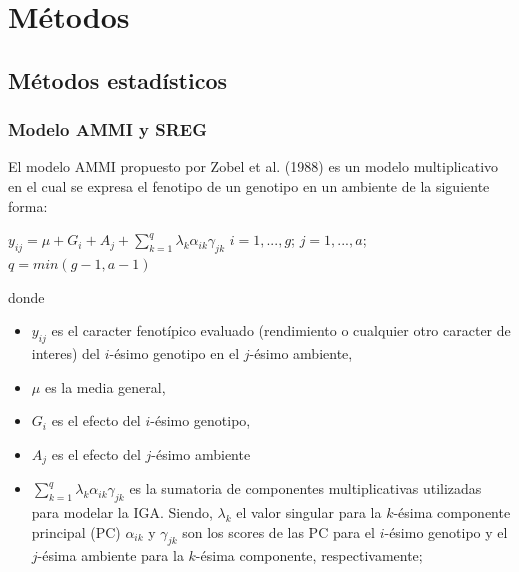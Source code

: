 
\chapter{Métodos}
\section{Métodos estadísticos}

\subsection{Modelo AMMI y SREG}

El modelo AMMI propuesto por Zobel et al. (1988) es un modelo multiplicativo en el cual se expresa el fenotipo de un genotipo en un ambiente de la siguiente forma:
\begin{center}
$y_{ij}= \mu +G_i + A_j + \sum_{k=1}^q \lambda_k \alpha_{ik} \gamma_{jk}$ \hspace{0.5cm} $ i=1,...,g$;\hspace{0.15cm} $ j=1,...,a$;\hspace{0.15cm} $q=min(g-1,a-1)$
\end{center} 
donde 
\begin{itemize}
\item $y_{ij}$ es el caracter fenotípico evaluado (rendimiento o cualquier otro caracter de interes) del $i$-ésimo genotipo en el $j$-ésimo ambiente,
\item $\mu$ es la media general,
\item  $G_i$ es el efecto del $i$-ésimo genotipo,
\item $A_j$ es el efecto del $j$-ésimo ambiente
\item $\sum_{k=1}^q \lambda_k \alpha_{ik} \gamma_{jk}$ es la sumatoria de componentes multiplicativas utilizadas para modelar la IGA. Siendo, $\lambda_k$ el valor singular para la  $k$-ésima componente principal (PC) $\alpha_{ik}$ y $\gamma_{jk}$ son los scores de las PC para el $i$-ésimo genotipo y el $j$-ésima ambiente para la $k$-ésima componente, respectivamente;
\end{itemize}

